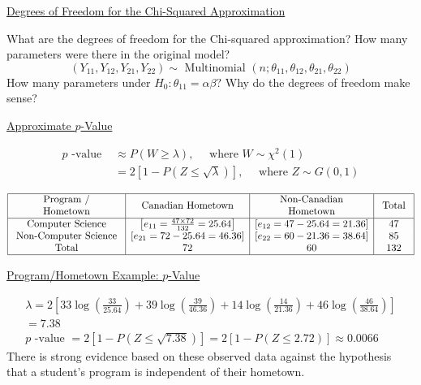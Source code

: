     \underline{Degrees of Freedom for the Chi-Squared Approximation}

    What are the degrees of freedom for the Chi-squared approximation?
How many parameters were there in the original model?
\[
\left(Y_{11}, Y_{12}, Y_{21}, Y_{22}\right) \sim \text { Multinomial }\left(n ; \theta_{11}, \theta_{12}, \theta_{21}, \theta_{22}\right)
\]
How many parameters under $H_{0}: \theta_{11}=\alpha \beta ?$
Why do the degrees of freedom make sense?

\underline{Approximate $ p $-Value}

\[ \begin{aligned}
    p \text { -value } & \approx P(W \geq \lambda), \quad \text { where } W \sim \chi^{2}(1) \\
    &=2[1-P(Z \leq \sqrt{\lambda})], \quad \text { where } Z \sim G(0,1)
    \end{aligned} \]

\begin{exbox}
    \begin{example}
        \[ \begin{array}{|c|c|c|c|}
            \hline \begin{array}{c}
            \text { Program / } \\
            \text { Hometown }
            \end{array} & \text { Canadian Hometown } & \begin{array}{c}
            \text { Non-Canadian } \\
            \text { Hometown }
            \end{array} & \text { Total } \\
            \hline \text { Computer Science } & {\left[e_{11}=\frac{47 \times 72}{132}=25.64\right]} & {\left[e_{12}=47-25.64=21.36\right]} & 47 \\
            \text { Non-Computer Science } & {\left[e_{21}=72-25.64=46.36\right]} & {\left[e_{22}=60-21.36=38.64\right]} & 85 \\
            \text { Total } & 72 & 60 & 132 \\
            \hline
            \end{array} \]
    
        \underline{Program/Hometown Example: $ p $-Value}

        \[
                \begin{aligned}
                \lambda=2\left[33 \log \left(\frac{33}{25.64}\right)+39 \log \left(\frac{39}{46.36}\right)+14 \log \left(\frac{14}{21.36}\right)+46 \log \left(\frac{46}{38.64}\right)\right] \\
                =7.38 \\
                p \text { -value }=2[1-P(Z \leq \sqrt{7.38})]=2[1-P(Z \leq 2.72)] \approx 0.0066
                \end{aligned}
                \]
                There is strong evidence based on these observed data against the hypothesis that a student's program is independent of their hometown.
    \end{example}
\end{exbox}

